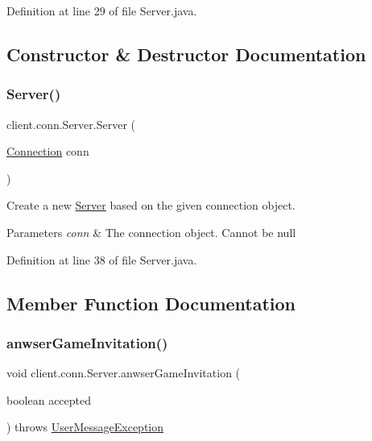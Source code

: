 Definition at line 29 of file Server.\+java.



\subsection{Constructor \& Destructor Documentation}
\hypertarget{classclient_1_1conn_1_1_server_aea9f06e94bc3d3653c06b192ba097a14}{}\label{classclient_1_1conn_1_1_server_aea9f06e94bc3d3653c06b192ba097a14} 
\subsubsection{\texorpdfstring{Server()}{Server()}}
{\footnotesize\ttfamily client.\+conn.\+Server.\+Server (\begin{DoxyParamCaption}\item[{\hyperlink{classpt_1_1up_1_1fe_1_1lpro1613_1_1sharedlib_1_1conn_1_1_connection}{Connection}}]{conn }\end{DoxyParamCaption})}

Create a new \hyperlink{classclient_1_1conn_1_1_server}{Server} based on the given connection object. 
\begin{DoxyParams}{Parameters}
{\em conn} & The connection object. Cannot be null \\
\hline
\end{DoxyParams}


Definition at line 38 of file Server.\+java.



\subsection{Member Function Documentation}
\hypertarget{classclient_1_1conn_1_1_server_a28692c894a8055b95dd493fbaec8b567}{}\label{classclient_1_1conn_1_1_server_a28692c894a8055b95dd493fbaec8b567} 
\subsubsection{\texorpdfstring{anwser\+Game\+Invitation()}{anwserGameInvitation()}}
{\footnotesize\ttfamily void client.\+conn.\+Server.\+anwser\+Game\+Invitation (\begin{DoxyParamCaption}\item[{boolean}]{accepted }\end{DoxyParamCaption}) throws \hyperlink{classpt_1_1up_1_1fe_1_1lpro1613_1_1sharedlib_1_1exceptions_1_1_user_message_exception}{User\+Message\+Exception}}

